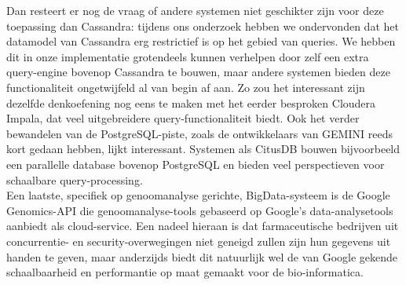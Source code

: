 Dan resteert er nog de vraag of andere systemen niet geschikter zijn voor deze toepassing dan Cassandra: tijdens ons onderzoek hebben we ondervonden dat het datamodel van Cassandra erg restrictief is op het gebied van queries. We hebben dit in onze implementatie grotendeels kunnen verhelpen door zelf een extra query-engine bovenop Cassandra te bouwen, maar andere systemen bieden deze functionaliteit ongetwijfeld al van begin af aan. Zo zou het interessant zijn dezelfde denkoefening nog eens te maken met het eerder besproken Cloudera Impala, dat veel uitgebreidere query-functionaliteit biedt. Ook het verder bewandelen van de PostgreSQL-piste, zoals de ontwikkelaars van GEMINI reeds kort gedaan hebben, lijkt interessant. Systemen als CitusDB \cite{citus_db} bouwen bijvoorbeeld een parallelle database bovenop PostgreSQL en bieden veel perspectieven voor schaalbare query-processing.
\\Een laatste, specifiek op genoomanalyse gerichte, BigData-systeem is de Google Genomics-API\cite{google_genomics} die genoomanalyse-tools gebaseerd op Google's data-analysetools aanbiedt als cloud-service. Een nadeel hieraan is dat farmaceutische bedrijven uit concurrentie- en security-overwegingen niet geneigd zullen zijn hun gegevens uit handen te geven, maar anderzijds biedt dit natuurlijk wel de van Google gekende schaalbaarheid en performantie op maat gemaakt voor de bio-informatica.